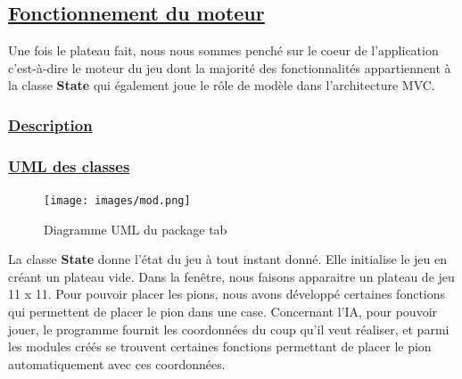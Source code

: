 \documentclass[12pt]{article}
\begin{document}
	\subsection{\underline{Fonctionnement du moteur}}
	Une fois le plateau fait, nous nous sommes penché sur le coeur de l'application c'est-à-dire le moteur du jeu dont la majorité des fonctionnalités appartiennent à la classe \textbf{State} qui également joue le rôle de modèle dans l'architecture MVC.
	
	\subsubsection{\underline{Description}}
  \subsubsection{\underline{UML des classes}}
	\begin{figure}[h!]
		\begin{center}
			\texttt{[image: images/mod.png]}
		\end{center}
		\caption{Diagramme UML du package tab}
		\label{tabuml}
	\end{figure}
	La classe \textbf{State} donne l'état du jeu à tout instant donné. Elle initialise le jeu en créant un plateau vide. Dans la fenêtre, nous faisons apparaitre un plateau de jeu 11 x 11. Pour pouvoir placer les pions, nous avons développé certaines fonctions qui permettent de placer le pion dans une case. Concernant l’IA, pour pouvoir jouer, le programme fournit les coordonnées du coup qu'il veut réaliser, et parmi les modules créés se trouvent certaines fonctions permettant de placer le pion automatiquement avec ces coordonnées.
\end{document}
